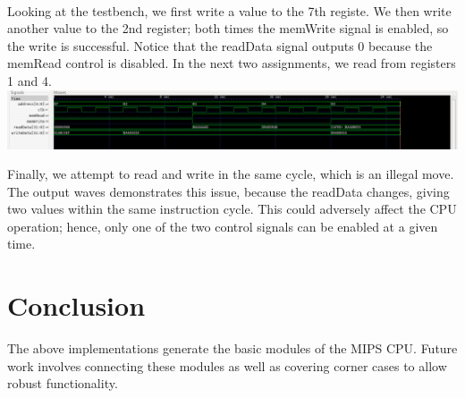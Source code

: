 \documentclass[twocolumn]{article}
\begin{document}
\\

Looking at the testbench, we first write a value to the 7th registe. We then write another value to the 2nd register; both times the memWrite signal is enabled, so the write is successful. Notice that the readData signal outputs 0 because the memRead control is disabled. In the next two assignments, we read from registers 1 and 4. \\ 

\begingroup
    \centering
    \medskip
    \includegraphics[width=\columnwidth]{Lab-Tex/Lab3-images/data-memory-wave.png}
    \medskip
\endgroup
\medskip

Finally, we attempt to read and write in the same cycle, which is an illegal move. The output waves demonstrates this issue, because the readData changes, giving two values within the same instruction cycle. This could adversely affect the CPU operation; hence, only one of the two control signals can be enabled at a given time. 

\section{Conclusion}

The above implementations generate the basic modules of the MIPS CPU. Future work involves connecting these modules as well as covering corner cases to allow robust functionality.




\printbibliography
\end{document}
